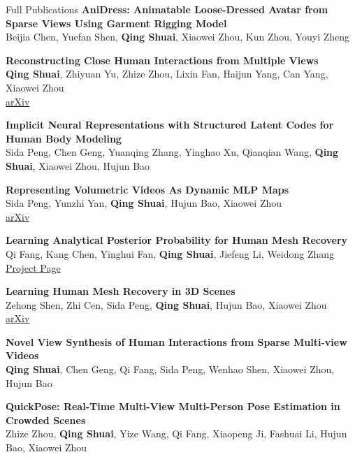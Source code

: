 \documentclass{resume}
\begin{document}
\begin{rSection}{Full Publications}
    {\bf AniDress: Animatable Loose-Dressed Avatar from Sparse Views Using Garment Rigging Model}\hfill{ } \\
    Beijia Chen, Yuefan Shen, \textbf{Qing Shuai}, Xiaowei Zhou, Kun Zhou, Youyi Zheng

    {\bf Reconstructing Close Human Interactions from Multiple Views}\hfill{ } \\
    \textbf{Qing Shuai}, Zhiyuan Yu, Zhize Zhou, Lixin Fan, Haijun Yang, Can Yang, Xiaowei Zhou\\
    \href{https://arxiv.org/abs/2401.16173}{arXiv}

    {\bf Implicit Neural Representations with Structured Latent Codes for Human Body Modeling}\hfill{ } \\
    Sida Peng, Chen Geng, Yuanqing Zhang, Yinghao Xu, Qianqian Wang, \textbf{Qing Shuai}, Xiaowei Zhou, Hujun Bao

    {\bf Representing Volumetric Videos As Dynamic MLP Maps}\hfill{ } \\
    Sida Peng, Yunzhi Yan, \textbf{Qing Shuai}, Hujun Bao, Xiaowei Zhou\\
    \href{https://arxiv.org/abs/2304.06717}{arXiv}

    {\bf Learning Analytical Posterior Probability for Human Mesh Recovery}\hfill{ } \\
    Qi Fang, Kang Chen, Yinghui Fan, \textbf{Qing Shuai}, Jiefeng Li, Weidong Zhang\\
    \href{https://netease-gameai.github.io/ProPose/}{Project Page}

    {\bf Learning Human Mesh Recovery in 3D Scenes}\hfill{ } \\
    Zehong Shen, Zhi Cen, Sida Peng, \textbf{Qing Shuai}, Hujun Bao, Xiaowei Zhou\\
    \href{https://arxiv.org/abs/2306.03847}{arXiv}

    {\bf Novel View Synthesis of Human Interactions from Sparse Multi-view Videos}\hfill{ } \\
    \textbf{Qing Shuai}, Chen Geng, Qi Fang, Sida Peng, Wenhao Shen, Xiaowei Zhou, Hujun Bao

    {\bf QuickPose: Real-Time Multi-View Multi-Person Pose Estimation in Crowded Scenes}\hfill{ } \\
    Zhize Zhou, \textbf{Qing Shuai}, Yize Wang, Qi Fang, Xiaopeng Ji, Fashuai Li, Hujun Bao, Xiaowei Zhou


\end{rSection}
\end{document}
